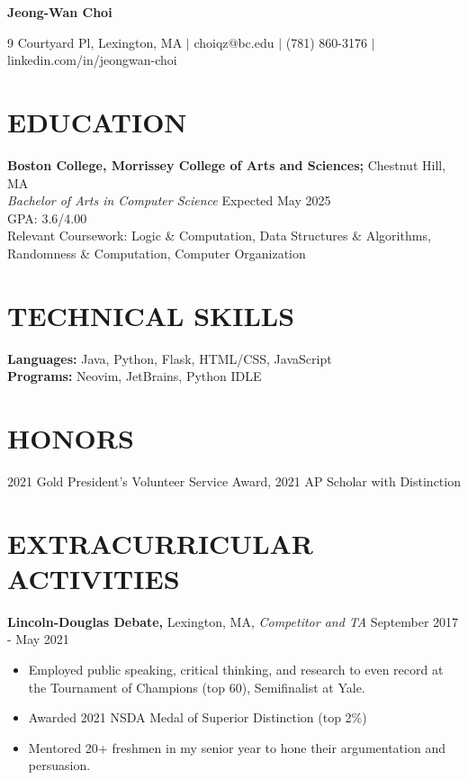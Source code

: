 \documentclass[11pt]{article}
\begin{document}
\begin{center}
\textbf{\LARGE Jeong-Wan Choi}
\end{center}

\begin{center}
9 Courtyard Pl, Lexington, MA $|$ choiqz@bc.edu $|$ (781) 860-3176 $|$ linkedin.com/in/jeongwan-choi 
\end{center}

\section*{EDUCATION}
\textbf{Boston College, Morrissey College of Arts and Sciences;} Chestnut Hill, MA \\
\textit{Bachelor of Arts in Computer Science} \hfill {Expected May 2025} \\
GPA: 3.6/4.00 \\
Relevant Coursework: Logic \& Computation, Data Structures \& Algorithms, Randomness \& Computation, Computer Organization

\section*{TECHNICAL SKILLS}
\textbf{Languages:} Java, Python, Flask, HTML/CSS, JavaScript \\
\textbf{Programs:} Neovim, JetBrains, Python IDLE

\section*{HONORS}
2021 Gold President’s Volunteer Service Award, 2021 AP Scholar with Distinction

\section*{EXTRACURRICULAR ACTIVITIES}
\textbf{Lincoln-Douglas Debate,} Lexington, MA, \textit{Competitor and TA} \hfill September 2017 - May 2021
\begin{itemize}[leftmargin=1.5em]
  \item Employed public speaking, critical thinking, and research to even record at the Tournament of Champions (top 60), Semifinalist at Yale.
  \item Awarded 2021 NSDA Medal of Superior Distinction (top 2\%)
  \item Mentored 20+ freshmen in my senior year to hone their argumentation and persuasion.
\end{itemize}
\end{document}
